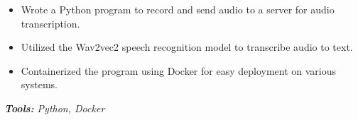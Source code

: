 \documentclass[10pt,letter]{altacv}
\begin{document}





\divider

\begin{itemize}
  \item Wrote a Python program to record and send audio to a server for audio transcription.
  \item Utilized the Wav2vec2 speech recognition model to transcribe audio to text.
  \item Containerized the program using Docker for easy deployment on various systems.
\end{itemize}
\textit{\textbf{Tools:} Python, Docker}
\end{document}
